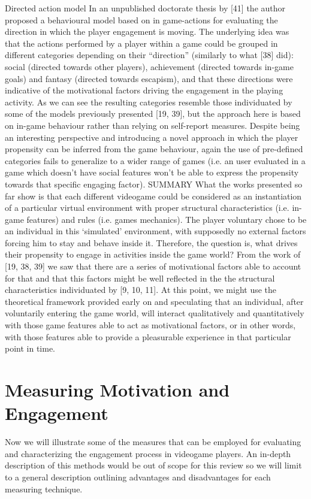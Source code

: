 Directed action model 
In an unpublished doctorate thesis by [41] the author proposed a behavioural model based on in game-actions for evaluating the direction in which the player engagement is moving. The underlying idea was that the actions performed by a player within a game could be grouped in different categories depending on their “direction” (similarly to what [38] did): social (directed towards other players), achievement (directed towards in-game goals) and fantasy (directed towards escapism), and that these directions were indicative of the motivational factors driving the engagement in the playing activity. As we can see the resulting categories resemble those individuated by some of the models previously presented [19, 39], but the approach here is based on in-game behaviour rather than relying on self-report measures. Despite being an interesting perspective and introducing a novel approach in which the player propensity can be inferred from the game behaviour, again the use of pre-defined categories fails to generalize to a wider range of games (i.e. an user evaluated in a game which doesn’t have social features won’t be able to express the propensity towards that specific engaging factor).
SUMMARY
What the works presented so far show is that each different videogame could be considered as an instantiation of a particular virtual environment with proper structural characteristics (i.e. in-game features) and rules (i.e. games mechanics). The player voluntary chose to be an individual in this ‘simulated’ environment, with supposedly no external factors forcing him to stay and behave inside it. Therefore, the question is, what drives their propensity to engage in activities inside the game world? From the work of [19, 38, 39] we saw that there are a series of motivational factors able to account for that and that this factors might be well reflected in the the structural characteristics individuated by [9, 10, 11]. At this point, we might use the theoretical framework provided early on and speculating that an individual, after voluntarily entering the game world, will interact qualitatively and quantitatively with those game features able to act as motivational factors, or in other words, with those features able to provide a pleasurable experience in that particular point in time.

\section{Measuring Motivation and Engagement}
\label{measuring_motivation_engagement}
Now we will illustrate some of the measures that can be employed for evaluating and characterizing the engagement process in videogame players. An in-depth description of this methods would be out of scope for this review so we will limit to a general description outlining advantages and disadvantages for each measuring technique.
